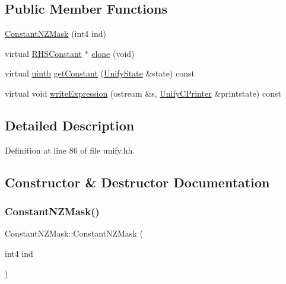 \subsection*{Public Member Functions}
\begin{DoxyCompactItemize}
\item 
\mbox{\hyperlink{class_constant_n_z_mask_abc9078d3e2a217a20e6feece90c72e95}{Constant\+N\+Z\+Mask}} (int4 ind)
\item 
virtual \mbox{\hyperlink{class_r_h_s_constant}{R\+H\+S\+Constant}} $\ast$ \mbox{\hyperlink{class_constant_n_z_mask_aa7255ee306a332b4b3cb8b606f8c3821}{clone}} (void)
\item 
virtual \mbox{\hyperlink{types_8h_a2db313c5d32a12b01d26ac9b3bca178f}{uintb}} \mbox{\hyperlink{class_constant_n_z_mask_a25a783d0e2e3c6f48959941fb28a60b6}{get\+Constant}} (\mbox{\hyperlink{class_unify_state}{Unify\+State}} \&state) const
\item 
virtual void \mbox{\hyperlink{class_constant_n_z_mask_a6a9514b0783ac757d8b25c93d543407e}{write\+Expression}} (ostream \&s, \mbox{\hyperlink{class_unify_c_printer}{Unify\+C\+Printer}} \&printstate) const
\end{DoxyCompactItemize}


\subsection{Detailed Description}


Definition at line 86 of file unify.\+hh.



\subsection{Constructor \& Destructor Documentation}
\mbox{\label{class_constant_n_z_mask_abc9078d3e2a217a20e6feece90c72e95}} 
\subsubsection{\texorpdfstring{ConstantNZMask()}{ConstantNZMask()}}
{\footnotesize\ttfamily Constant\+N\+Z\+Mask\+::\+Constant\+N\+Z\+Mask (\begin{DoxyParamCaption}\item[{int4}]{ind }\end{DoxyParamCaption})\hspace{0.3cm}{\ttfamily [inline]}}



